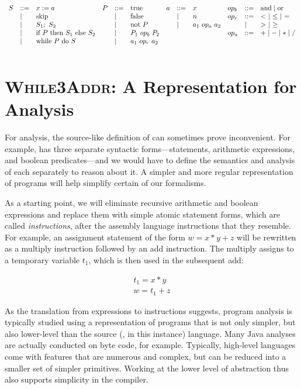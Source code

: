 \documentclass[11pt]{article}
\begin{document}
\[
\begin{array}{llllllllllll}
S & ::= & x := a    & P & ::= & \mbox{true}    & a & ::= & x  & op_b & ::= & \mbox{and} \mathrel{\mid} \mbox{or} \\
  & \mathrel{\mid} & \mbox{skip}    &   & \mathrel{\mid} & \mbox{false}   &   & \mathrel{\mid} & n   & op_r & ::= & <~ \mathrel{\mid} ~\le~ \mathrel{\mid} ~= \\
  & \mathrel{\mid} & S_1;~ S_2 &   & \mathrel{\mid} & \mbox{not}~ P  &   & \mathrel{\mid} & a_1 ~op_a~ a_2   & & \mathrel{\mid} & >~ \mathrel{\mid} ~\ge~ \\ 
  & \mathrel{\mid} & \mbox{if}~ P ~\mbox{then}~ S_1 ~\mbox{else}~ S_2      &   & \mathrel{\mid} & P_1 ~op_b~ P_2 &   &     &            & op_a & ::= & + \mathrel{\mid} - \mathrel{\mid} * \mathrel{\mid} /  \\
  & \mathrel{\mid} & \mbox{while}~ P ~\mbox{do}~ S   &   & \mathrel{\mid} & a_1 ~op_r~ a_2 \\[2ex] 
\end{array}
\]

\clearpage
\section{\textsc{While3Addr}: A Representation for Analysis}

For analysis, the source-like definition of \WhileLang can sometimes prove
inconvenient.  For example, \WhileLang has three separate syntactic
forms---statements, arithmetic expressions, and boolean predicates---and we
would have to define the semantics and analysis of each separately to reason about it.  A
simpler and more regular representation of programs will help simplify certain
of our formalisms.

As a starting point, we will eliminate recursive arithmetic and boolean
expressions and replace them with simple atomic statement forms, which are
called \textit{instructions}, after the assembly language instructions that they
resemble.  For example, an assignment statement of the form $w = x*y+z$ will be
rewritten as a multiply instruction followed by an add instruction.  The
multiply assigns to a temporary variable $t_1$, which is then used in the
subsequent add:

\[
\begin{array}{l}
t_1 = x * y \\
w = t_1 + z
\end{array}
\]

As the translation from expressions to instructions suggests, program analysis
is typically studied using a representation of programs that is not only
simpler, but also lower-level than the source (\WhileLang, in this instance)
language.  Many Java analyses are actually conducted on byte code, for example.
Typically, high-level languages come with features that are numerous and
complex, but can be reduced into a smaller set of simpler primitives.  Working
at the lower level of abstraction thus also supports simplicity in the compiler.
\end{document}

